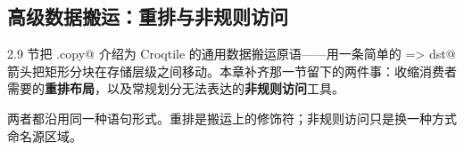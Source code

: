 \subsection*{高级数据搬运：重排与非规则访问}

2.9 节把 \co@dma.copy@ 介绍为 Croqtile 的通用数据搬运原语——用一条简单的 \co@src => dst@ 箭头把矩形分块在存储层级之间移动。本章补齐那一节留下的两件事：收缩消费者需要的\textbf{重排布局}，以及常规划分无法表达的\textbf{非规则访问}工具。

两者都沿用同一种语句形式。重排是搬运上的修饰符；非规则访问只是换一种方式命名源区域。
